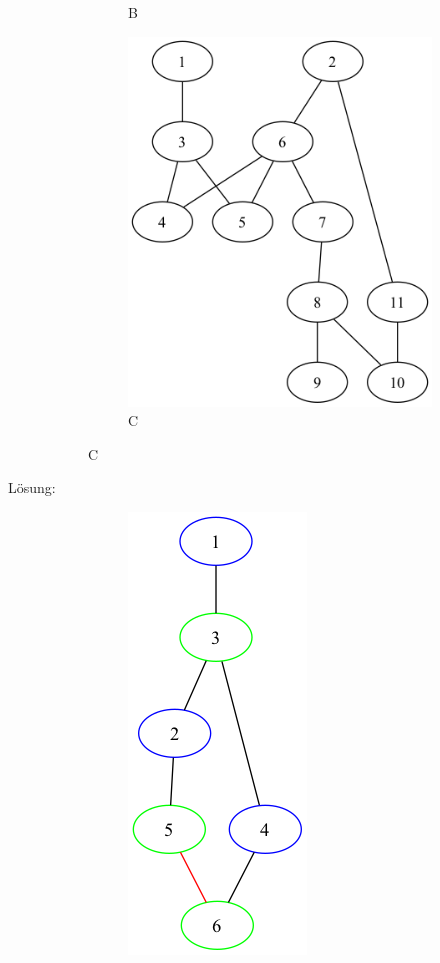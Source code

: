 \documentclass[a4paper,11pt]{report}
\begin{document}
\begin{description}
\begin{figure}[htbp]
\begin{subfigure}[b]{0.3\textwidth}
                \caption{B}
                \label{fig:a01_b}
            \end{subfigure}
            \hfill
            \begin{subfigure}[b]{0.3\textwidth}
                \includegraphics[height=0.2\textheight]{notebooks/assets/aufgabe_01/C}
                \caption{C}
                \label{fig:a01_c}
            \end{subfigure}
            \hfill
        \end{figure}
        \item[Lösung:] \hfill \newline %
        \begin{figure}[htbp]
            \centering
            \begin{subfigure}[b]{0.3\textwidth}
                \includegraphics[height=0.2\textheight]{notebooks/assets/aufgabe_01/A_colored}

\end{subfigure}
\end{figure}
\end{description}
\end{document}
